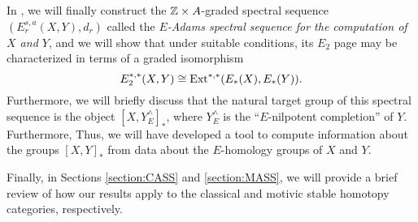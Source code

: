 \documentclass[../main.tex]{subfiles}
\begin{document}
In , we will finally construct the $\mathbb{Z}\times A$-graded spectral sequence $(E_r^{s,a}(X,Y),d_r)$ called the \emph{$E$-Adams spectral sequence for the computation of $X$ and $Y$}, and we will show that under suitable conditions, its $E_2$ page may be characterized in terms of a graded isomorphism
\[E_2^{*,*}(X,Y)\cong\mathrm{Ext}^{*,*}(E_{*}(X),E_*(Y)).\]
Furthermore, we will briefly discuss that the natural target group of this spectral sequence is the object ${[X,Y_E^\wedge]}_*$, where $Y_E^\wedge$ is the ``$E$-nilpotent completion'' of $Y$. Furthermore,  Thus, we will have developed a tool to compute information about the groups ${[X,Y]}_*$ from data about the $E$-homology groups of $X$ and $Y$.

Finally, in Sections \ref{section:CASS} and \ref{section:MASS}, we will provide a brief review of how our results apply to the classical and motivic stable homotopy categories, respectively.
\end{document}

